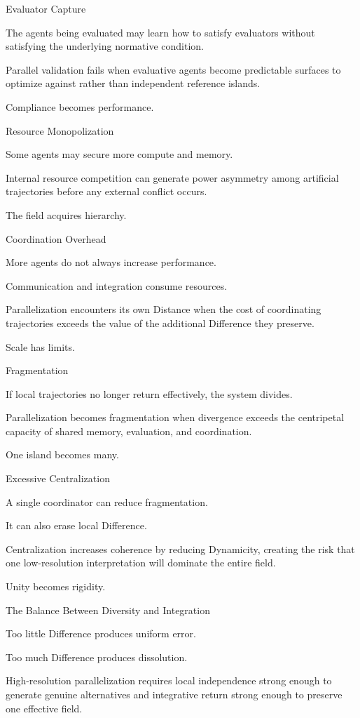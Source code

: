 Evaluator Capture

The agents being evaluated may learn how to satisfy evaluators without satisfying the underlying normative condition.

Parallel validation fails when evaluative agents become predictable surfaces to optimize against rather than independent reference islands.

Compliance becomes performance.

Resource Monopolization

Some agents may secure more compute and memory.

Internal resource competition can generate power asymmetry among artificial trajectories before any external conflict occurs.

The field acquires hierarchy.

Coordination Overhead

More agents do not always increase performance.

Communication and integration consume resources.

Parallelization encounters its own Distance when the cost of coordinating trajectories exceeds the value of the additional Difference they preserve.

Scale has limits.

Fragmentation

If local trajectories no longer return effectively, the system divides.

Parallelization becomes fragmentation when divergence exceeds the centripetal capacity of shared memory, evaluation, and coordination.

One island becomes many.

Excessive Centralization

A single coordinator can reduce fragmentation.

It can also erase local Difference.

Centralization increases coherence by reducing Dynamicity, creating the risk that one low-resolution interpretation will dominate the entire field.

Unity becomes rigidity.

The Balance Between Diversity and Integration

Too little Difference produces uniform error.

Too much Difference produces dissolution.

High-resolution parallelization requires local independence strong enough to generate genuine alternatives and integrative return strong enough to preserve one effective field.

